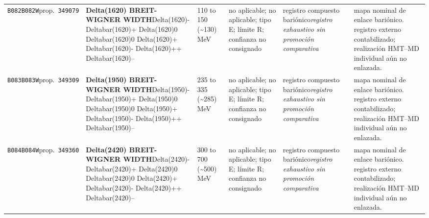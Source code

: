 \begin{landscape}
\begin{longtable}{L{1.85cm}L{4.45cm}L{2.35cm}L{4.05cm}L{3.35cm}L{7.15cm}}
\texttt{B082}\newline \texttt{B082W}\newline prop.\ \texttt{349079} & \textbf{Delta(1620) BREIT-WIGNER WIDTH}\newline Delta(1620)- \textbar{}\allowbreak{} Deltabar(1620)+ \textbar{}\allowbreak{} Delta(1620)0 \textbar{}\allowbreak{} Deltabar(1620)0 \textbar{}\allowbreak{} Delta(1620)+ \textbar{}\allowbreak{} Deltabar(1620)- \textbar{}\allowbreak{} Delta(1620)++ \textbar{}\allowbreak{} Deltabar(1620)-- & 110 to 150 (\textasciitilde{}130)\,MeV & no aplicable; no aplicable; tipo E; límite R; confianza no consignado & registro compuesto bariónico\newline \emph{registro exhaustivo sin promoción comparativa} & mapa nominal de enlace bariónico. registro externo contabilizado; realización HMT--MD individual aún no enlazada. \\
\texttt{B083}\newline \texttt{B083W}\newline prop.\ \texttt{349309} & \textbf{Delta(1950) BREIT-WIGNER WIDTH}\newline Delta(1950)- \textbar{}\allowbreak{} Deltabar(1950)+ \textbar{}\allowbreak{} Delta(1950)0 \textbar{}\allowbreak{} Deltabar(1950)0 \textbar{}\allowbreak{} Delta(1950)+ \textbar{}\allowbreak{} Deltabar(1950)- \textbar{}\allowbreak{} Delta(1950)++ \textbar{}\allowbreak{} Deltabar(1950)-- & 235 to 335 (\textasciitilde{}285)\,MeV & no aplicable; no aplicable; tipo E; límite R; confianza no consignado & registro compuesto bariónico\newline \emph{registro exhaustivo sin promoción comparativa} & mapa nominal de enlace bariónico. registro externo contabilizado; realización HMT--MD individual aún no enlazada. \\
\texttt{B084}\newline \texttt{B084W}\newline prop.\ \texttt{349360} & \textbf{Delta(2420) BREIT-WIGNER WIDTH}\newline Delta(2420)- \textbar{}\allowbreak{} Deltabar(2420)+ \textbar{}\allowbreak{} Delta(2420)0 \textbar{}\allowbreak{} Deltabar(2420)0 \textbar{}\allowbreak{} Delta(2420)+ \textbar{}\allowbreak{} Deltabar(2420)- \textbar{}\allowbreak{} Delta(2420)++ \textbar{}\allowbreak{} Deltabar(2420)-- & 300 to 700 (\textasciitilde{}500)\,MeV & no aplicable; no aplicable; tipo E; límite R; confianza no consignado & registro compuesto bariónico\newline \emph{registro exhaustivo sin promoción comparativa} & mapa nominal de enlace bariónico. registro externo contabilizado; realización HMT--MD individual aún no enlazada. \\

\end{longtable}
\end{landscape}
